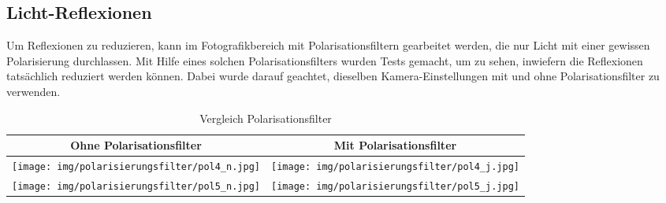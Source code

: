 \documentclass[../main.tex]{subfiles}
\begin{document}
\newpage
\subsection{Licht-Reflexionen}
Um Reflexionen zu reduzieren, kann im Fotografikbereich mit Polarisationsfiltern gearbeitet werden, die nur Licht mit einer gewissen Polarisierung durchlassen. Mit Hilfe eines solchen Polarisationsfilters wurden Tests gemacht, um zu sehen, inwiefern die Reflexionen tatsächlich reduziert werden können. Dabei wurde darauf geachtet, dieselben Kamera-Einstellungen mit und ohne Polarisationsfilter zu verwenden.

\begin{table}[h!]
    \centering
    \begin{tabular}{|c|c|}
        \hline
        \parbox[c][1.5cm][c]{4.5cm}{\centering Ohne Polarisationsfilter} &
        \parbox[c][1.5cm][c]{4.5cm}{\centering Mit Polarisationsfilter} \\
        \hline
        \begin{minipage}[c]{5cm}
            \centering
            \vspace{3mm} %
            \texttt{[image: img/polarisierungsfilter/pol4\_n.jpg]}
            \vspace{3mm} %
        \end{minipage} &
        \begin{minipage}[c]{5cm}
            \centering
            \vspace{3mm} %
            \texttt{[image: img/polarisierungsfilter/pol4\_j.jpg]}
            \vspace{3mm} %
        \end{minipage} \\
        \hline 
        \begin{minipage}[c]{5cm}
            \centering
            \vspace{3mm} %
            \texttt{[image: img/polarisierungsfilter/pol5\_n.jpg]}
            \vspace{3mm} %
        \end{minipage} &
        \begin{minipage}[c]{5cm}
            \centering
            \vspace{3mm} %
            \texttt{[image: img/polarisierungsfilter/pol5\_j.jpg]}
            \vspace{3mm} %
        \end{minipage} \\
        \hline
    \end{tabular}
    \caption{Vergleich Polarisationsfilter}
\end{table}
\end{document}
